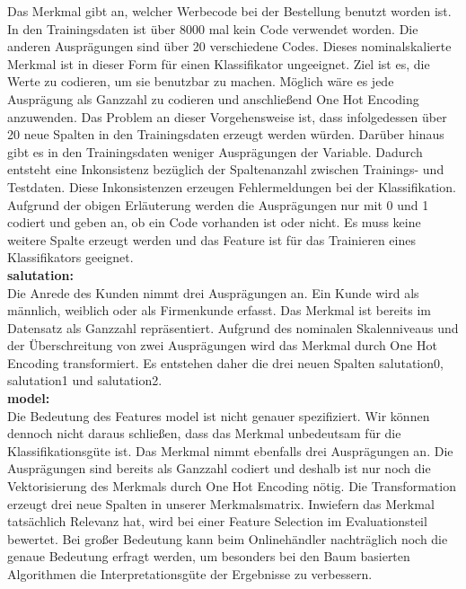 Das Merkmal gibt an, welcher Werbecode bei der Bestellung benutzt worden ist. In den Trainingsdaten ist über 8000 mal kein Code verwendet worden. Die anderen Ausprägungen sind über 20 verschiedene Codes. Dieses nominalskalierte Merkmal ist in dieser Form für einen Klassifikator ungeeignet. Ziel ist es, die Werte zu codieren, um sie benutzbar zu machen. Möglich wäre es jede Ausprägung als Ganzzahl zu codieren und anschließend One Hot Encoding anzuwenden. Das Problem an dieser Vorgehensweise ist, dass infolgedessen über 20 neue Spalten in den Trainingsdaten erzeugt werden würden. Darüber hinaus gibt es in den Trainingsdaten weniger Ausprägungen der Variable. Dadurch entsteht eine Inkonsistenz bezüglich der Spaltenanzahl zwischen Trainings- und Testdaten. Diese Inkonsistenzen erzeugen Fehlermeldungen bei der Klassifikation. Aufgrund der obigen Erläuterung werden die Ausprägungen nur mit 0 und 1 codiert und geben an, ob ein Code vorhanden ist oder nicht. Es muss keine weitere Spalte erzeugt werden und das Feature ist für das Trainieren eines Klassifikators geeignet.\\

\textbf{salutation:}\\

Die Anrede des Kunden nimmt drei Ausprägungen an. Ein Kunde wird als männlich, weiblich oder als Firmenkunde erfasst. Das Merkmal ist bereits im Datensatz als Ganzzahl repräsentiert. Aufgrund des nominalen Skalenniveaus und der Überschreitung von zwei Ausprägungen wird das Merkmal durch One Hot Encoding transformiert. Es entstehen daher die drei neuen Spalten salutation0, salutation1 und salutation2.\\

\textbf{model:}\\

Die Bedeutung des Features model ist nicht genauer spezifiziert. Wir können dennoch nicht daraus schließen, dass das Merkmal unbedeutsam für die Klassifikationsgüte ist. Das Merkmal nimmt ebenfalls drei Ausprägungen an. Die Ausprägungen sind bereits als Ganzzahl codiert und deshalb ist nur noch die Vektorisierung des Merkmals durch One Hot Encoding nötig. Die Transformation erzeugt drei neue Spalten in unserer Merkmalsmatrix. Inwiefern das Merkmal tatsächlich Relevanz hat, wird bei einer Feature Selection im Evaluationsteil bewertet. Bei großer Bedeutung kann beim Onlinehändler nachträglich noch die genaue Bedeutung erfragt werden, um besonders bei den Baum basierten Algorithmen die Interpretationsgüte der Ergebnisse zu verbessern. \\

